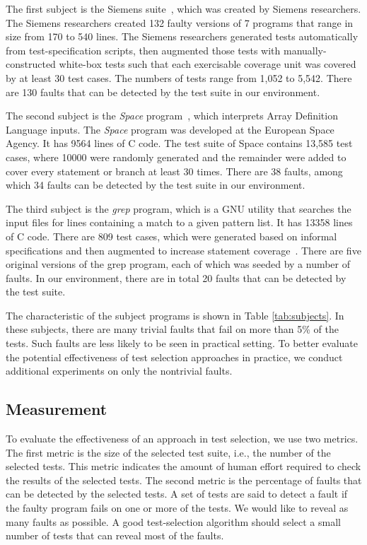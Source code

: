 \documentclass{sig-alternate}
\begin{document}
The first subject is the Siemens suite~\cite{Hutchins94}, which was
created by Siemens researchers. The Siemens researchers created 132
faulty versions of 7 programs that range in size from 170 to 540
lines. The Siemens researchers generated tests automatically from
test-specification scripts, then augmented those tests with
manually-constructed white-box tests such that each exercisable
coverage unit was covered by at least 30 test cases. The numbers of
tests range from 1,052 to 5,542. There are 130 faults that can be
detected by the test suite in our environment.

The second subject is the {\it Space} program~\cite{Rothermel01},
which interprets Array Definition Language inputs. The {\it Space}
program was developed at the European Space Agency. It has 9564
lines of C code. The test suite of Space contains 13,585 test cases,
where 10000 were randomly generated and the remainder were added to
cover every statement or branch at least 30 times. There are 38
faults, among which 34 faults can be detected by the test suite in
our environment.



The third subject is the {\it grep} program, which is a GNU utility
that searches the input files for lines containing a match to a
given pattern list. It has 13358 lines of C code. There are 809 test
cases, which were generated based on informal specifications and
then augmented to increase statement coverage~\cite{SIR}. There are
five original versions of the grep program, each of which was seeded
by a number of faults. In our environment, there are in total 20
faults that can be detected by the test suite.


The characteristic of the subject programs is shown in Table
\ref{tab:subjects}. In these subjects, there are many trivial faults
that fail on more than 5\% of the tests. Such faults are less likely
to be seen in practical setting. To better evaluate the potential
effectiveness of test selection approaches in practice, we conduct
additional experiments on only the nontrivial faults.




\subsection{Measurement}



To evaluate the effectiveness of an approach in test selection, we
use two metrics. The first metric is the size of the selected test
suite, i.e., the number of the selected tests. This metric indicates
the amount of human effort required to check the results of the
selected tests. The second metric is the percentage of faults that
can be detected by the selected tests. A set of tests are said to
detect a fault if the faulty program fails on one or more of the
tests. We would like to reveal as many faults as possible. A good
test-selection algorithm should select a small number of tests that
can reveal most of the faults.
\end{document}
